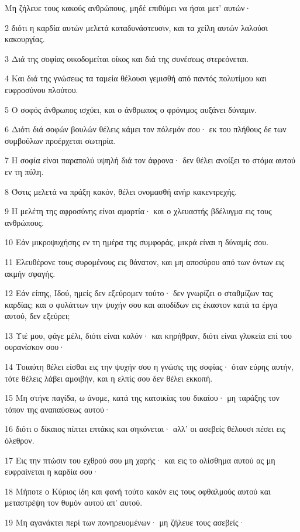 \par Μη ζήλευε τους κακούς ανθρώπους, μηδέ επιθύμει να ήσαι μετ' αυτών·
\par 2 διότι η καρδία αυτών μελετά καταδυνάστευσιν, και τα χείλη αυτών λαλούσι κακουργίας.
\par 3 Διά της σοφίας οικοδομείται οίκος και διά της συνέσεως στερεόνεται.
\par 4 Και διά της γνώσεως τα ταμεία θέλουσι γεμισθή από παντός πολυτίμου και ευφροσύνου πλούτου.
\par 5 Ο σοφός άνθρωπος ισχύει, και ο άνθρωπος ο φρόνιμος αυξάνει δύναμιν.
\par 6 Διότι διά σοφών βουλών θέλεις κάμει τον πόλεμόν σου· εκ του πλήθους δε των συμβούλων προέρχεται σωτηρία.
\par 7 Η σοφία είναι παραπολύ υψηλή διά τον άφρονα· δεν θέλει ανοίξει το στόμα αυτού εν τη πύλη.
\par 8 Όστις μελετά να πράξη κακόν, θέλει ονομασθή ανήρ κακεντρεχής.
\par 9 Η μελέτη της αφροσύνης είναι αμαρτία· και ο χλευαστής βδέλυγμα εις τους ανθρώπους.
\par 10 Εάν μικροψυχήσης εν τη ημέρα της συμφοράς, μικρά είναι η δύναμίς σου.
\par 11 Ελευθέρονε τους συρομένους εις θάνατον, και μη αποσύρου από των όντων εις ακμήν σφαγής.
\par 12 Εάν είπης, Ιδού, ημείς δεν εξεύρομεν τούτο· δεν γνωρίζει ο σταθμίζων τας καρδίας; και ο φυλάττων την ψυχήν σου και αποδίδων εις έκαστον κατά τα έργα αυτού, δεν εξεύρει;
\par 13 Υιέ μου, φάγε μέλι, διότι είναι καλόν· και κηρήθραν, διότι είναι γλυκεία επί του ουρανίσκον σου·
\par 14 Τοιαύτη θέλει είσθαι εις την ψυχήν σου η γνώσις της σοφίας· όταν εύρης αυτήν, τότε θέλεις λάβει αμοιβήν, και η ελπίς σου δεν θέλει εκκοπή.
\par 15 Μη στήνε παγίδα, ω άνομε, κατά της κατοικίας του δικαίου· μη ταράξης τον τόπον της αναπαύσεως αυτού·
\par 16 διότι ο δίκαιος πίπτει επτάκις και σηκόνεται· αλλ' οι ασεβείς θέλουσι πέσει εις όλεθρον.
\par 17 Εις την πτώσιν του εχθρού σου μη χαρής· και εις το ολίσθημα αυτού ας μη ευφραίνεται η καρδία σου·
\par 18 Μήποτε ο Κύριος ίδη και φανή τούτο κακόν εις τους οφθαλμούς αυτού και μεταστρέψη τον θυμόν αυτού απ' αυτού.
\par 19 Μη αγανάκτει περί των πονηρευομένων· μη ζήλευε τους ασεβείς·

